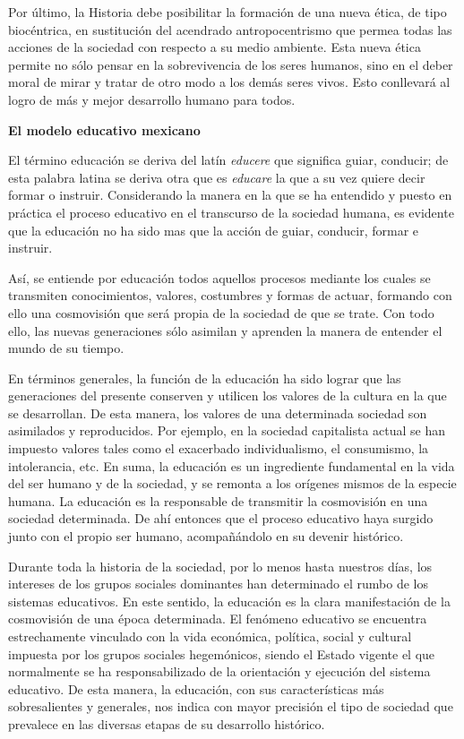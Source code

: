 Por último, la Historia debe posibilitar la formación de una nueva 
ética, de tipo biocéntrica, en sustitución del acendrado 
antropocentrismo que permea todas las acciones de la sociedad con 
respecto a su medio ambiente. Esta nueva ética permite no sólo pensar 
en la sobrevivencia de los seres humanos, sino en el deber moral de 
mirar y tratar de otro modo a los demás seres vivos. Esto conllevará al 
logro de más y mejor desarrollo humano para todos.  
\enlargethispage{-1\baselineskip}

{\bfseries El modelo educativo mexicano}

El término educación se deriva del latín \textit{educere} que significa 
guiar, conducir; de esta palabra latina se deriva otra que es 
\textit{educare} la que a su vez quiere decir formar o instruir. 
Considerando la manera en la que se ha entendido y puesto en práctica 
el proceso educativo en el transcurso de la sociedad humana, es 
evidente que la educación no ha sido mas que la  acción de guiar, 
conducir, formar e instruir.

Así, se entiende por educación todos aquellos procesos mediante los 
cuales se transmiten conocimientos, valores, costumbres y formas de 
actuar, formando con ello una cosmovisión que será propia de la 
sociedad de que se trate. Con todo ello, las nuevas generaciones sólo 
asimilan y aprenden la manera de entender el mundo de su tiempo.

En términos generales, la función de la educación ha sido lograr que 
las generaciones del presente conserven y utilicen los valores de la 
cultura en la que se desarrollan. De esta manera, los valores de una 
determinada sociedad son asimilados y reproducidos. Por ejemplo, en la 
sociedad capitalista actual se han impuesto valores tales como el 
exacerbado individualismo, el consumismo, la intolerancia, etc. En 
suma, la educación es un ingrediente fundamental en la vida del ser 
humano y de la sociedad, y se remonta a los orígenes mismos de la 
especie humana. La educación es la responsable de transmitir la 
cosmovisión en una sociedad determinada. De ahí entonces que el proceso 
educativo haya surgido junto con el propio ser humano, acompañándolo en 
su devenir histórico.  

Durante toda la historia de la sociedad, por lo menos hasta nuestros 
días, los intereses de los grupos sociales dominantes han determinado 
el rumbo de los sistemas educativos. En este sentido, la educación es 
la clara manifestación de la cosmovisión de una época determinada. El 
fenómeno educativo se encuentra estrechamente vinculado con la vida 
económica, política, social y cultural impuesta por los grupos sociales 
hegemónicos, siendo el Estado vigente el que normalmente se ha 
responsabilizado de la orientación y ejecución del sistema educativo. 
De esta manera, la educación, con sus características más 
sobresalientes y generales, nos indica con mayor precisión el tipo de 
sociedad que prevalece en las diversas etapas de su desarrollo 
histórico.  

